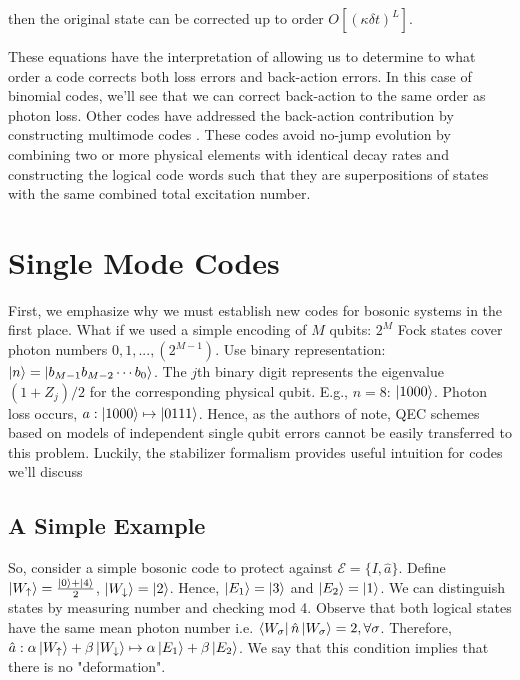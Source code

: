 \documentclass[12]{amsart}
\newcommand\0{\mathbf{0}}
\newcommand\<{\langle}
\renewcommand\>{\rangle}
\begin{document}
then the original state can be corrected up to order $O[(\kappa \delta t)^L]$.

These equations have the interpretation of allowing us to determine to what order a code corrects both loss errors and back-action errors. In this case of binomial codes, we'll see that we can correct back-action to the same order as photon loss. Other codes have addressed the back-action contribution by constructing multimode codes \cite{chuang1997bosonic}. These codes avoid no-jump evolution by combining two or more physical elements with identical decay rates and constructing the logical code words such that they are superpositions of states with the same combined total excitation number.

\section{Single Mode Codes}

First, we emphasize why we must establish new codes for bosonic systems in the first place. What if we used a simple encoding of $M$ qubits: $2^M$ Fock states cover photon numbers $0, 1, . . . , (2^{M - 1})$. Use binary representation: $\ket{n} = \ket{b_{M-1} b_{M-2} \cdots b_0 }$. The $j$th binary digit represents the eigenvalue $(1 + Z_j)/2$ for the corresponding physical qubit. E.g., $n=8$: $\ket{1000}$. Photon loss occurs, $a : \ket{1000} \mapsto \ket{0111}$. Hence, as the authors of \cite{michael2016new} note, QEC schemes based on models of independent single qubit errors cannot be easily transferred to this problem. Luckily, the stabilizer formalism provides useful intuition for codes we'll discuss

\subsection{A Simple Example}
\label{sec:simple}

So, consider a simple bosonic code to protect against $\mathcal{E} = \{ I, \hat{a} \}$. Define $\ket{W_\uparrow} = \frac{\ket{0} + \ket{4}}{2}$, $\ket{W_\downarrow} = \ket{2}$. Hence, $\ket{E_1} = \ket{3}$ and $\ket{E_2} = \ket{1}$. We can distinguish states by measuring number and checking mod 4. Observe that both logical states have the same mean photon number i.e. $\bra{W_\sigma} \hat{n} \ket{W_\sigma} = 2, \forall \sigma$. Therefore, $\hat{a} : \alpha\ket{W_\uparrow} + \beta\ket{W_\downarrow} \mapsto \alpha \ket{E_1} + \beta \ket{E_2}$. We say that this condition implies that there is no "deformation".
\end{document}
